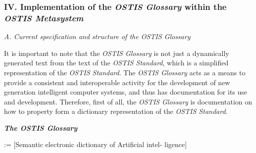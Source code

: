 \documentclass{article}
\begin{document}
\begin{multicols}{2}
\begin{center}

\subsubsection*{\textmd{\normalsize{IV. Implementation of the \textit{OSTIS Glossary} within the
\textit{OSTIS Metasystem}}}}
 
 \end{center}

\textit{A. Current specification and structure of the OSTIS
Glossary}

\quad
It is important to note that the \textit{OSTIS Glossary} is not
just a dynamically generated text from the text of the
\textit{OSTIS Standard}, which is a simplified representation of
the \textit{OSTIS Standard}. The \textit{OSTIS Glossary} acts as a means
to provide a consistent and interoperable activity for
the development of new generation intelligent computer
systems, and thus has documentation for its use and
development. Therefore, first of all, the \textit{OSTIS Glossary}
is documentation on how to property form a dictionary
representation of the \textit{OSTIS Standard}.

\textit{\textbf{The OSTIS Glossary}}

:= \hspace{6mm} [Semantic electronic dictionary of Artificial intel-
ligence]

\end{multicols}
\end{document}
